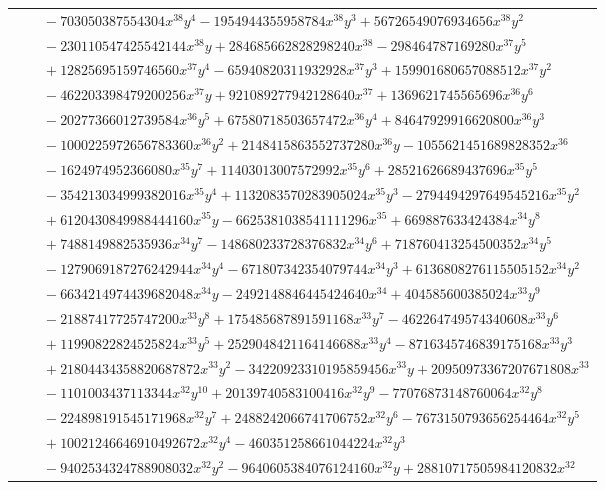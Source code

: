 \documentclass[11pt]{article}
\begin{document}
\begin{longtable}{@{}ll@{}}
 & $\quad -703050387554304x^{38}y^{4}-1954944355958784x^{38}y^{3}+56726549076934656x^{38}y^{2}$\\
 & $\quad -230110547425542144x^{38}y+284685662828298240x^{38}-298464787169280x^{37}y^{5}$\\
 & $\quad +12825695159746560x^{37}y^{4}-65940820311932928x^{37}y^{3}+159901680657088512x^{37}y^{2}$\\
 & $\quad -462203398479200256x^{37}y+921089277942128640x^{37}+1369621745565696x^{36}y^{6}$\\
 & $\quad -20277366012739584x^{36}y^{5}+67580718503657472x^{36}y^{4}+84647929916620800x^{36}y^{3}$\\
 & $\quad -1000225972656783360x^{36}y^{2}+2148415863552737280x^{36}y-1055621451689828352x^{36}$\\
 & $\quad -1624974952366080x^{35}y^{7}+11403013007572992x^{35}y^{6}+28521626689437696x^{35}y^{5}$\\
 & $\quad -354213034999382016x^{35}y^{4}+1132083570283905024x^{35}y^{3}-2794494297649545216x^{35}y^{2}$\\
 & $\quad +6120430849988444160x^{35}y-6625381038541111296x^{35}+669887633424384x^{34}y^{8}$\\
 & $\quad +7488149882535936x^{34}y^{7}-148680233728376832x^{34}y^{6}+718760413254500352x^{34}y^{5}$\\
 & $\quad -1279069187276242944x^{34}y^{4}-671807342354079744x^{34}y^{3}+6136808276115505152x^{34}y^{2}$\\
 & $\quad -6634214974439682048x^{34}y-2492148846445424640x^{34}+404585600385024x^{33}y^{9}$\\
 & $\quad -21887417725747200x^{33}y^{8}+175485687891591168x^{33}y^{7}-462264749574340608x^{33}y^{6}$\\
 & $\quad +11990822824525824x^{33}y^{5}+2529048421164146688x^{33}y^{4}-8716345746839175168x^{33}y^{3}$\\
 & $\quad +21804434358820687872x^{33}y^{2}-34220923310195859456x^{33}y+20950973367207671808x^{33}$\\
 & $\quad -1101003437113344x^{32}y^{10}+20139740583100416x^{32}y^{9}-77076873148760064x^{32}y^{8}$\\
 & $\quad -224898191545171968x^{32}y^{7}+2488242066741706752x^{32}y^{6}-7673150793656254464x^{32}y^{5}$\\
 & $\quad +10021246646910492672x^{32}y^{4}-460351258661044224x^{32}y^{3}$\\
 & $\quad -9402534324788908032x^{32}y^{2}-9640605384076124160x^{32}y+28810717505984120832x^{32}$\\

\end{longtable}
\end{document}
